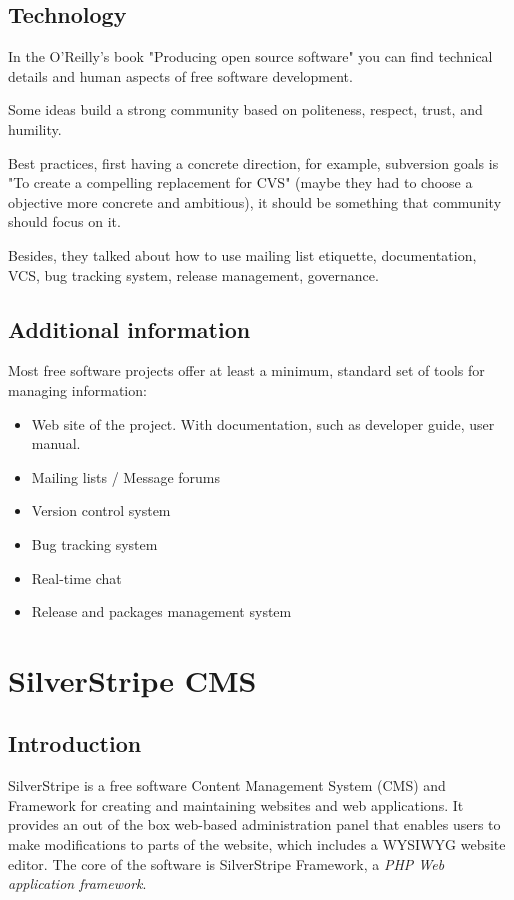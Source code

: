 \documentclass[11pt]{article}
\begin{document}
\subsection{Technology}
In the O'Reilly's book "Producing open source software" you can find technical details and human aspects of free software development.

Some ideas build a strong community based on politeness, respect, trust, and humility.

Best practices, first having a concrete direction, for example, subversion goals is "To create a compelling replacement for CVS" (maybe they had to choose a objective more concrete and ambitious), it should be something that community should focus on it.

Besides, they talked about how to use mailing list etiquette, documentation, VCS, bug tracking system, release management, governance.

\subsection{Additional information}
Most free software projects offer at least a minimum, standard set of tools for managing information:
\begin{itemize}
	\item Web site of the project. With documentation, such as developer guide, user manual.
	\item Mailing lists / Message forums
	\item Version control system
	\item Bug tracking system
	\item Real-time chat
	\item Release and packages management system
\end{itemize}

\newpage


\section{SilverStripe CMS}

\subsection{Introduction}
SilverStripe is a free software Content Management System (CMS) and Framework for creating and maintaining websites and web applications. It provides an out of the box web-based administration panel that enables users to make modifications to parts of the website, which includes a WYSIWYG website editor. The core of the software is SilverStripe Framework, a \emph{PHP Web application framework}.
\end{document}

